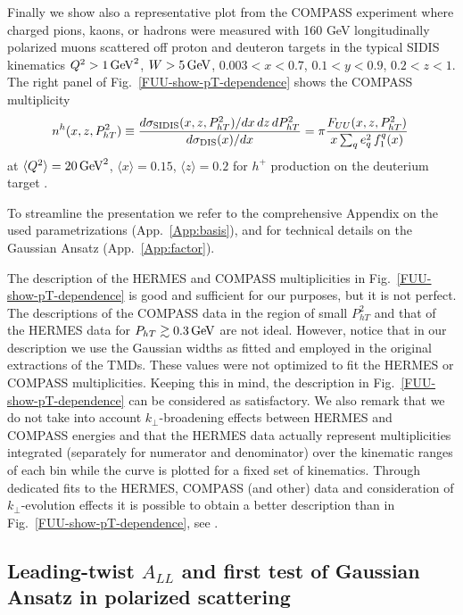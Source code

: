 \documentclass[a4paper,11pt]{article}
\newcommand{\be}{\begin{equation}}
\newcommand{\ee}{\end{equation}}
\newcommand{\la}{\langle}
\newcommand{\ra}{\rangle}
\def\Phperp{P_{hT}}
\def\kperp{k_\perp}
\begin{document}
Finally we show also a representative plot from the COMPASS experiment
where charged pions, kaons, or hadrons were measured with 160 GeV
longitudinally polarized muons scattered off proton and deuteron
targets in the typical SIDIS kinematics
$Q^2 > 1 \,{\rm GeV}^2$, $W > 5\,{\rm GeV}$,
$0.003 < x < 0.7$, $0.1<y < 0.9$, $0.2<z<1$.
The right panel of
Fig.~\ref{FUU-show-pT-dependence} shows the COMPASS multiplicity
\cite{Aghasyan:2017ctw}
\be\label{Eq:multiplicity-COMPASS}
	n^h(x,z,\Phperp^2)  \equiv
	\frac{d\sigma_{\rm SIDIS}(x,z,\Phperp^2)/dx\,dz\,d\Phperp^2}
	{d\sigma_{\rm DIS}(x)/dx} =
	\pi \frac{F_{UU}(x,z,\Phperp^2) }{ x \sum_q e_q^2\,f^q_1(x)}\;
\ee
at $\la Q^2\ra=20\,{\rm GeV}^2$, $\la x\ra  =0.15$, $\la z\ra  =0.2$
for $h^+$ production on the deuterium target \cite{Aghasyan:2017ctw}.

To streamline the presentation we refer to the comprehensive Appendix
on the used parametrizations (App.~\ref{App:basis}), and for
technical details on the Gaussian Ansatz (App.~\ref{App:factor}).

The description of the HERMES and COMPASS multiplicities in
Fig.~\ref{FUU-show-pT-dependence} is good and sufficient for our
purposes, but it is not perfect. The descriptions of the COMPASS
data in the region of small $\Phperp^2$ and that of the HERMES data
for $\Phperp \gtrsim 0.3\,{\rm GeV}$ are not ideal.
However, notice that in our description we use the Gaussian widths
as fitted and employed in the original extractions of the TMDs. These
values were not optimized to fit the HERMES or COMPASS multiplicities.
Keeping this in mind, the description in Fig.~\ref{FUU-show-pT-dependence}
can be considered as satisfactory. We also remark that we do not take
into account $\kperp$-broadening effects between HERMES and
COMPASS energies and that the HERMES data actually represent
multiplicities integrated (separately for numerator and denominator)
over the kinematic ranges of each bin while the curve is plotted for
a fixed set of kinematics. Through dedicated fits to the HERMES, COMPASS
(and other) data and consideration of $\kperp$-evolution effects
it is possible to obtain a better description than in
Fig.~\ref{FUU-show-pT-dependence}, see \cite{Bacchetta:2017gcc}.

\subsection{\boldmath Leading-twist $A_{LL}$ and first test of Gaussian Ansatz
	in polarized scattering}
\label{Sec-5.2:FLL-basis}
\end{document}
